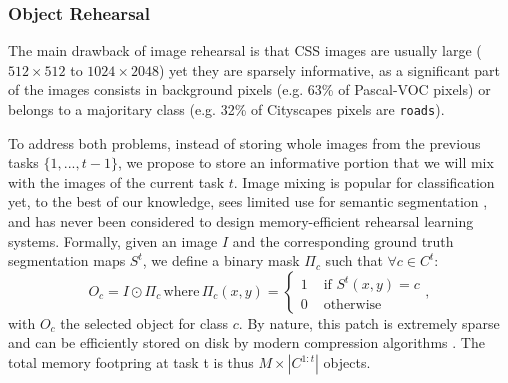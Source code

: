 \subsubsection{Object Rehearsal}

The main drawback of image rehearsal is that CSS images are usually large ($512\times 512$ to $1024
    \times 2048$) yet they are sparsely informative, as a significant part of the images consists in
background pixels \citep{lin2017focalloss} (e.g. 63\% of Pascal-VOC \citep{everingham2015pascalvoc}
pixels) or belongs to a majoritary class (e.g. 32\% of Cityscapes \citep{cordts2016cityscapes} pixels
are \texttt{roads}).

To address both problems, instead of storing whole images from the previous tasks $\{1, ..., t-1\}$,
we propose to store an informative portion that we will mix with the images of the current task $t$.
Image mixing is popular for classification
\citep{hingyi2018mixup,yun2019cutmix,dabouei2020supermix,verma2019manifoldmixup,li2021moex,rame2021mixmo}
yet, to the best of our knowledge, sees limited use for semantic segmentation
\citep{fang2019instaboost,olsson2021classmix,zhang2021objectaug,tranheden2021dacs,ghiasi2020simplecopypaste},
and has never been considered to design memory-efficient rehearsal learning systems. Formally, given
an image $I$ and the corresponding ground truth segmentation maps $S^t$, we define a binary mask
$\Pi_c$  such that $\forall c \in C^t$:
%
\begin{equation}
    O_c = I \odot \Pi_c\,\text{where}\,\Pi_c(x, y) =
    \begin{cases}
        1 & \text { if } S^t(x, y) = c \\
        0 & \text { otherwise }
    \end{cases},
    \label{eq:mask_object}
\end{equation}
%
\noindent with $O_c$ the selected object for class $c$. By nature, this patch is extremely sparse
and can be efficiently stored on disk by modern compression algorithms \citep{ISO10918}. The total
memory footpring at task t is thus $M \times |C^{1:t}|$ objects.

